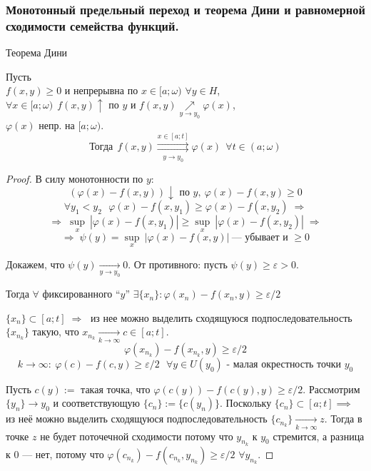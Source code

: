 \subsubsection{Монотонный предельный переход и теорема Дини и равномерной сходимости семейства функций.}

\begin{theorem*} Теорема Дини

    Пусть \\
	\phantom{Пусть} $f(x, y) \ge 0$ и непрерывна по $x \in [a; \omega)$ $\forall y \in H$, \\
	\phantom{Пусть} $\forall x \in [a; \omega) \ \ f(x, y) \uparrow$ по $y$ и $f(x, y) \underset{y \to y_0}{\nearrow} \varphi(x)$, \\
	\phantom{Пусть} $\varphi(x)$ непр. на $[a; \omega)$.
    \[ \text{Тогда} \ \ f(x, y) \overset{x \in [a; t]}{\underset{y \to y_0}{\rightrightarrows}} \varphi(x) \ \ \forall t \in (a; \omega) \]
\end{theorem*}
\begin{proof}
    В силу монотонности по $y$:
    \[ (\varphi(x) - f(x, y)) \downarrow \text{ по } y, \ \varphi(x) - f(x, y) \ge 0 \]
    \[ \forall y_1 < y_2 \ \ \ \varphi(x) - f(x, y_1) \ge \varphi(x) - f(x, y_2) \;\Rightarrow \]
    \[ \Rightarrow\; \underset{x}{\sup}\:\left| \varphi(x) - f(x, y_1) \right| \ge 
    \underset{x}{\sup}\:\left| \varphi(x) - f(x, y_2) \right| \;\Rightarrow \]
    \[ \Rightarrow\; \psi(y) = \underset{x}{\sup}\:\left| \varphi(x) - f(x, y) \right| \ \text{--- убывает и } \ge 0 \]
    
    Докажем, что $\psi(y) \xrightarrow[y \to y_0]{} 0$. От противного: пусть $\psi(y) \ge \varepsilon > 0$.

    Тогда $\forall$ фиксированного ``$y$'' $\exists \{ x_n \} \colon \varphi(x_n) - f(x_n, y) \ge \varepsilon / 2$
    
    $\{ x_n \} \subset [a; t] \;\Rightarrow\;$ из нее можно выделить сходящуюся подпоследовательность $\{ x_{n_k} \}$ такую, что $x_{n_k} \xrightarrow[k \to \infty]{} c \in [a; t]$.
    \[ \varphi(x_{n_k}) - f(x_{n_k}, y) \ge \varepsilon / 2 \]
    \[ k \to \infty: \ \varphi(c) - f(c, y) \ge \varepsilon / 2 \ \ \ \forall y \in U(y_0) \textrm{ - малая окрестность точки } y_0 \]

    Пусть $c(y) := $ такая точка, что $\varphi(c(y)) - f(c(y), y) \geq \varepsilon / 2$. Рассмотрим $\{y_n\} \to y_0$ и соответствующую
    $\{c_n\} := \{c(y_n)\}$. Поскольку $\{c_n\} \subset [a; t] \implies$ из неё можно выделить сходящуюся
    подпоследовательность $\{c_{n_k}\} \xrightarrow[k\to\infty]{} z$. Тогда в точке $z$ не будет поточечной сходимости
    потому что $y_{n_k}$ к $y_0$ стремится, а разница к 0 --- нет, потому что $\varphi(c_{n_k}) - f(c_{n_k}, y_{n_k}) \geq \varepsilon/2$
    $\forall y_{n_k}$.
\end{proof}
